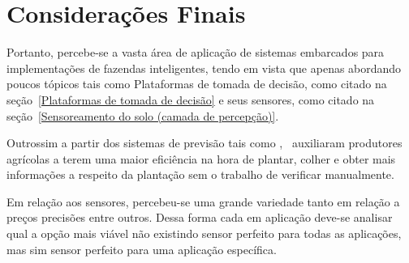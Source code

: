 \documentclass[
article,			%
12pt,				%
oneside,			%
a4paper,			%
english,			%
brazil,				%
sumario=tradicional
]{abntex2}
\begin{document}
\section{Considerações Finais}
Portanto, percebe-se a vasta área de aplicação de sistemas embarcados para implementações de fazendas inteligentes, tendo em vista que apenas abordando poucos tópicos tais como Plataformas de tomada de decisão, como citado na seção~\ref{Plataformas de tomada de decisão} e seus sensores, como citado na seção~\ref{Sensoreamento do solo (camada de percepção)}.

Outrossim a partir dos sistemas de previsão tais como \cite{1},~\cite{2} auxiliaram produtores agrícolas a terem uma maior eficiência na hora de plantar, colher e obter mais informações a respeito da plantação sem o trabalho de verificar manualmente.

Em relação aos sensores, percebeu-se uma grande variedade tanto em relação a preços precisões entre outros. Dessa forma cada em aplicação deve-se analisar qual a opção mais viável não existindo sensor perfeito para todas as aplicações, mas sim sensor perfeito para uma aplicação específica.

\postextual

\cleardoublepage


%
%
\end{document}
